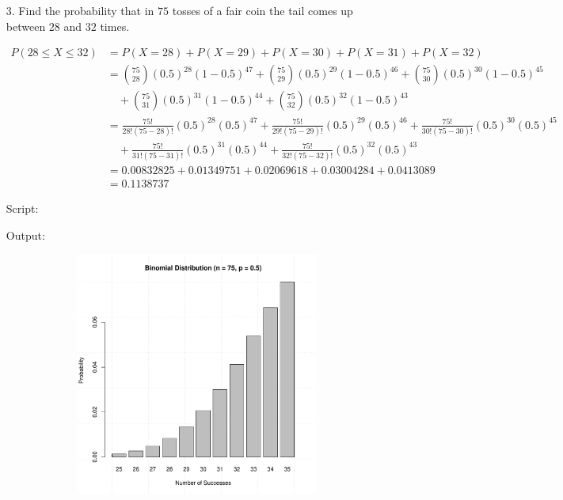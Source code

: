 \documentclass[a4paper,11pt,openright]{report}
\begin{document}
\begin{enumerate}
\pagebreak

\item[3.] Find the probability that in $75$ tosses of a fair coin the tail comes up between
$28$ and $32$ times.

\begin{equation*}
\begin{split}
P(28 \leq X \leq 32) & = P(X = 28) + P(X = 29) + P(X = 30) + P(X = 31) + P(X = 32) \\
					 & = \binom{75}{28} (0.5)^{28} (1-0.5)^{47} + \binom{75}{29} (0.5)^{29} (1-0.5)^{46} + \binom{75}{30} (0.5)^{30} (1-0.5)^{45} \\
					 &\quad + \binom{75}{31} (0.5)^{31} (1-0.5)^{44} + \binom{75}{32} (0.5)^{32} (1-0.5)^{43} \\
					 & = \frac{75!}{28! (75-28)!} (0.5)^{28} (0.5)^{47} + \frac{75!}{29! (75-29)!} (0.5)^{29} (0.5)^{46} + \frac{75!}{30! (75-30)!} (0.5)^{30} (0.5)^{45} \\
					 &\quad + \frac{75!}{31! (75-31)!} (0.5)^{31} (0.5)^{44} + \frac{75!}{32! (75-32)!} (0.5)^{32} (0.5)^{43} \\
					 & = 0.00832825 + 0.01349751 + 0.02069618 + 0.03004284 + 0.0413089 \\
					 & = 0.1138737
\end{split}
\end{equation*}

Script:


Output:


\begin{figure}[ht!]
\includegraphics[width=16cm,height=8cm,keepaspectratio]{plot3.pdf}
\centering
\end{figure}


\end{enumerate}
\end{document}
